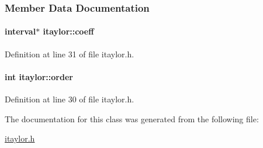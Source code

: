 \subsubsection{\-Member \-Data \-Documentation}
\hypertarget{classitaylor_a45521302408d376be9603aea42eb45f0}{
\paragraph[{coeff}]{\setlength{\rightskip}{0pt plus 5cm}interval$\ast$ {\bf itaylor\-::coeff}}}\label{classitaylor_a45521302408d376be9603aea42eb45f0}


\-Definition at line 31 of file itaylor.\-h.

\hypertarget{classitaylor_a83c1b0a5a14fb5f0e0323adcc9b60a40}{
\paragraph[{order}]{\setlength{\rightskip}{0pt plus 5cm}int {\bf itaylor\-::order}}}\label{classitaylor_a83c1b0a5a14fb5f0e0323adcc9b60a40}


\-Definition at line 30 of file itaylor.\-h.



\-The documentation for this class was generated from the following file\-:\begin{DoxyCompactItemize}
\item 
\hyperlink{itaylor_8h}{itaylor.\-h}\end{DoxyCompactItemize}
